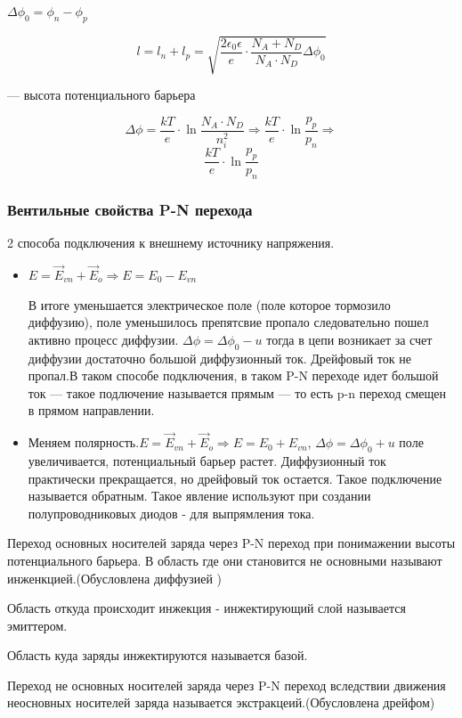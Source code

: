 \documentclass[../main.tex]{subfiles}
\begin{document}
$\Delta \phi_0 = \phi_n - \phi_p$


\[l = l_n + l_p = \sqrt{\frac{2 \epsilon_0 \epsilon}{e} \cdot \frac{N_A + N_D}{N_A \cdot N_D} \Delta \phi_0}\]
\begin{center}
    --- высота потенциального барьера    
\end{center}

\[\Delta \phi = \frac{kT}{e} \cdot \ln{\frac{N_A \cdot N_D}{n_i^2}} \Rightarrow \frac{kT}{e} \cdot \ln{\frac{p_p}{p_n}} \Rightarrow\]
\[\frac{kT}{e} \cdot \ln{\frac{p_p}{p_n}}\]

\subsubsection{Вентильные свойства P-N перехода}

2 способа подключения к внешнему источнику напряжения.
\begin{itemize}
    \item $E = \vec E_{vn} + \vec E_o \Rightarrow E  = E_0 - E_{vn}$
    
    В итоге уменьшается электрическое поле (поле которое тормозило диффузию), поле уменьшилось препятсвие пропало следовательно пошел активно процесс диффузии.
    $\Delta \phi = \Delta \phi_0 - u$ тогда в цепи возникает за счет диффузии достаточно большой диффузионный ток. Дрейфовый ток не пропал.В таком способе подключения, в таком P-N переходе
    идет большой ток --- такое подлючение называется прямым --- то есть p-n переход смещен в прямом направлении.

    \item Меняем полярность.$E = \vec E_{vn} + \vec E_o \Rightarrow E  = E_0 + E_{vn}$, $\Delta \phi = \Delta \phi_0 + u$ поле увеличивается, потенциальный барьер растет.
    Диффузионный ток практически прекращается, но дрейфовый ток остается. Такое подключение называется обратным. Такое явление используют при создании полупроводниковых диодов - для выпрямления тока.
\end{itemize}

 Переход основных носителей заряда через P-N переход при понимажении высоты потенциального барьера. В область где они становится не основными называют инженкцией.(Обусловлена диффузией )

 Область откуда происходит инжекция - инжектирующий слой называется эмиттером. 

 Область куда заряды инжектируются называется базой.

 Переход не основных носителей заряда через P-N переход вследствии движения неосновных носителей заряда называется экстракцеий.(Обусловлена дрейфом)
\end{document}
